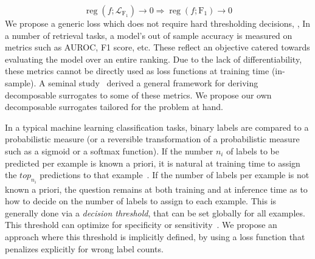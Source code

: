 %
\begin{equation}
\operatorname{reg}\left(f ; \mathcal{L}_{\mathrm{F_1}}\right) \rightarrow 0 \Longrightarrow \operatorname{reg}\left(f ; \mathrm{F_1}\right) \rightarrow 0
\end{equation}
%
We propose a generic loss which does not require hard thresholding decisions, , 
In a number of retrieval tasks, a model's out of sample accuracy is measured
on metrics such as AUROC, F1 score, etc. These reflect an objective catered
towards evaluating the model over an entire ranking. Due to the lack of
differentiability, these metrics cannot be directly used as loss functions at
training time (in-sample). A seminal study~\cite{optimizableLosses} derived a general framework for deriving decomposable surrogates to some of these metrics. We propose our own decomposable surrogates tailored for the problem at hand.

In a typical machine learning classification tasks, binary labels are compared to a probabilistic measure (or a reversible
transformation of a probabilistic measure such as a sigmoid or a softmax
function). If the number $n_i$ of labels to be predicted per
example is known a priori, it is natural at training time to assign the $top_{n_i}$ predictions
to that example~\cite{lossTopKError, topKmulticlassSVM}. If the number of
labels per example is not known a priori, the question remains at both training and at inference time
as to how to decide on the number of labels to assign to each
example. This is generally done via a \emph{decision threshold}, that can be set globally for all
examples. This threshold can optimize for specificity or
sensitivity~\cite{decisionThreshold}. We propose an approach where this threshold is implicitly defined, by using a loss function that penalizes explicitly for wrong label counts.



